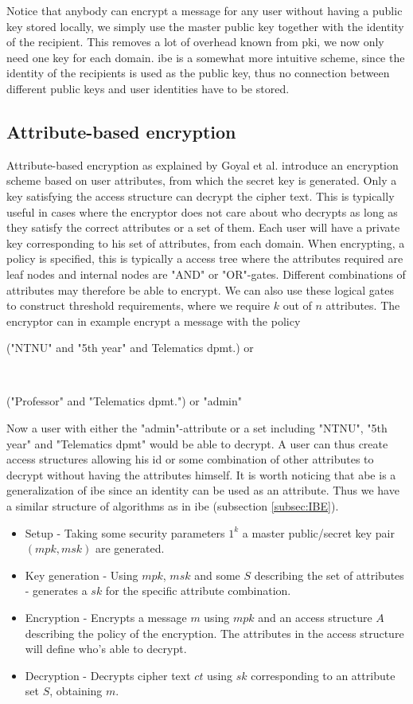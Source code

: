Notice that anybody can encrypt a message for any user without having a public key stored locally, we simply use the master public key together with the identity of the recipient. This removes a lot of overhead known from \gls{pki}, we now only need one key for each domain. \Gls{ibe} is a somewhat more intuitive scheme, since the identity of the recipients is used as the public key, thus no connection between different public keys and user identities have to be stored.

\subsection{Attribute-based encryption}\label{subsec:ABE}

Attribute-based encryption as explained by Goyal et al. \cite{ABE} introduce an encryption scheme based on user attributes, from which the secret key is generated. Only a key satisfying the access structure can decrypt the cipher text. This is typically useful in cases where the encryptor does not care about who decrypts as long as they satisfy the correct attributes or a set of them. Each user will have a private key corresponding to his set of attributes, from each domain. When encrypting, a policy is specified, this is typically a access tree where the attributes required are leaf nodes and internal nodes are "AND" or "OR"-gates. Different combinations of attributes may therefore be able to encrypt. We can also use these logical gates to construct threshold requirements, where we require $k$ out of $n$ attributes. The encryptor can in example encrypt a message with the policy\\ \centerline{("NTNU" and "5th year" and Telematics dpmt.) or} \\ \centerline{("Professor" and "Telematics dpmt.") or "admin"}
Now a user with either the "admin"-attribute or a set including "NTNU", "5th year" and "Telematics dpmt" would be able to decrypt. A user can thus create access structures allowing his id or some combination of other attributes to decrypt without having the attributes himself. It is worth noticing that \gls{abe} is a generalization of \gls{ibe} since an identity can be used as an attribute. Thus we have a similar structure of algorithms as in \gls{ibe} (subsection \ref{subsec:IBE}).

\begin{itemize}
\item Setup - Taking some security parameters $1^k$ a master public/secret key pair $(mpk, msk)$ are generated.
\item Key generation - Using $mpk$, $msk$ and some $S$ describing the set of attributes - generates a $sk$ for the specific attribute combination. 
\item Encryption - Encrypts a message $m$ using $mpk$ and an access structure $A$ describing the policy of the encryption. The attributes in the access structure will define who's able to decrypt. 
\item Decryption - Decrypts cipher text $ct$ using $sk$ corresponding to an attribute set $S$, obtaining $m$. 
\end{itemize}


